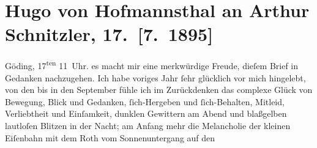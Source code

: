 

         
         \renewcommand{\erwaehntePersonen}{Personen: Richard Beer-Hofmann, Paul Goldmann, Hugo von Hofmannsthal, Edgar von Karg-Bebenburg, Felix Salten}
         \renewcommand{\erwaehnteOrte}{Orte: Bad Ischl, Hodonín, Hotel und Pension Rudolfshöhe (Leopold Petter), Salesianergasse, Salzburg}
         \renewcommand{\erwaehnteWerke}{Werke: Pan}
               \section[Hugo von Hofmannsthal an Arthur Schnitzler, 17. {[}7. 1895{]}]{ Hugo von Hofmannsthal an Arthur Schnitzler, 17. {[}7. 1895{]}}\nopagebreak{}\rehead{ }\begin{ledgroupsized}[t]{13cm}\normalsize\beginnumbering \toendnotes[C]{\smallbreak\pagebreak[2]} 
\toendnotes[C]{\smallbreak}\pstart
           \raggedleft{}{\pb}Göding, 17\textsuperscript{ten}{ }11 Uhr. \pend
           \pstart
           \raggedleft{}\textcolor{gray}{\textbf{}}\pend
           \pstart
           es macht mir eine merkwürdige Freude, dieſem Brief in Gedanken nachzugehen. Ich habe
               voriges Jahr ſehr glücklich vor mich hingelebt, von den \label{K_L00464-1v}\label{K_L00464-1h} bis in den September
               fühle ich im Zurückdenken das complexe Glück von Bewegung, Blick und Gedanken,
               ſich-Hergeben und ſich-Behalten, Mitleid, Verliebtheit und Einſamkeit, dunklen
               Gewittern am Abend und blaßgelben lautloſen Blitzen in der Nacht; am Anfang mehr die
               Melancholie der kleinen Eiſenbahn mit dem Roth vom Sonnenuntergang auf den

\end{ledgroupsized}
